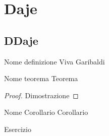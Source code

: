 \documentclass[11pt, a4paper, twoside]{article}
\begin{document}
\tableofcontents
\newpage
\section{Daje}

\subsection{DDaje}

\begin{defn}{Nome definizione}{}
	 Viva Garibaldi
\end{defn}

\begin{thm}{Nome teorema}{}
	Teorema
\end{thm}

\begin{proof}
	Dimostrazione
\end{proof}

\begin{cor}{Nome Corollario}{}
	Corollario
\end{cor}

\begin{ese}
	Esercizio
\end{ese}

\begin{sol}
\end{sol}
\end{document}
